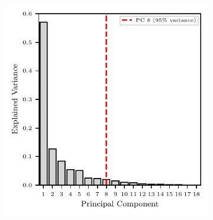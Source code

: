 \documentclass{report}
\begin{document}
         \begin{figure}[H]
                \centering
                \begin{subfigure}[b]{0.4\textwidth}
                    \includegraphics[width=\textwidth, height=0.39\textheight]{plots/chapter_6/pfa_dbscan_explained_variance_nifedipine.pdf}
                    \caption[Variance Explained by Principal Component Analysis (PCA) for Nifedipine]{}
                    \label{fig:variance_explained_nifedipine}
                \end{subfigure}
                ~
                \begin{subfigure}[b]{0.4\textwidth}
                     \centering

\end{subfigure}
\end{figure}
\end{document}
